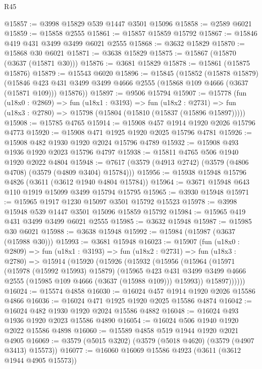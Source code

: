 \begin{lexlean}{R45}
\begin{coremodule}
@15857 := @3998 @15829 @539 @1447 @3501 @15096
@15858 := @2589 @6021
@15859 := @15858 @2555
@15861 := @15857 @15859 @15792
@15867 := @15846 @419 @431 @3499 @3499 @6021 @2555
@15868 := @3632 @15829
@15870 := @15868 @30 @6021
@15871 := @3638 @15829
@15875 := @15867 (@15870 (@3637 (@15871 @30)))
@15876 := @3681 @15829
@15878 := @15861 (@15875 @15876)
@15879 := @15543 @6020
@15896 := @15845
    (@15852
      (@15878 @15879)
      (@15846 @423 @431 @3499 @3499 @4666 @2555 (@15868 @109 @4666 (@3637 (@15871 @109))) @15876))
@15897 := @9506 @15794
@15907 := @15778
    (fun (u18x0 : @2869) =>
    fun (u18x1 : @3193) =>
    fun (u18x2 : @2731) => fun (u18x3 : @2780) => @15798 (@15804 (@15810 (@15837 (@15896 @15897)))))
@15908 := @15785 @4765
@15914 := @15908 @457 @1914 @1920 @2026 @15796 @4773
@15920 := @15908 @471 @1925 @1920 @2025 @15796 @4781
@15926 := @15908 @482 @1930 @1920 @2024 @15796 @4789
@15932 := @15908 @493 @1936 @1920 @2023 @15796 @4797
@15938 := @15811 @4765 @506 @1940 @1920 @2022 @4804
@15948 := @7617 (@3579 (@4913 @2742) (@3579 (@4806 @4708) (@3579 (@4809 @3404) @15784)))
@15956 := @15938 @15948 @15796 @4826 (@3611 (@3612 @1940 @4804 @15784))
@15964 := @3671 @15948 @643 @110 @1919 @15099 @3499 @15794 @15795
@15965 := @3930 @15948
@15971 := @15965 @1917 @1230 @15097 @3501 @15792 @15523
@15978 := @3998 @15948 @539 @1447 @3501 @15096 @15859 @15792
@15984 := @15965 @419 @431 @3499 @3499 @6021 @2555
@15985 := @3632 @15948
@15987 := @15985 @30 @6021
@15988 := @3638 @15948
@15992 := @15984 (@15987 (@3637 (@15988 @30)))
@15993 := @3681 @15948
@16023 := @15907
    (fun (u18x0 : @2809) =>
    fun (u18x1 : @3193) =>
    fun (u18x2 : @2731) =>
    fun (u18x3 : @2780) =>
    @15914
      (@15920
        (@15926
          (@15932
            (@15956
              (@15964
                (@15971
                  (@15978 (@15992 @15993) @15879)
                  (@15965
                    @423
                    @431
                    @3499
                    @3499
                    @4666
                    @2555
                    (@15985 @109 @4666 (@3637 (@15988 @109)))
                    @15993))
                @15897))))))
@16024 := @15574 @4858
@16030 := @16024 @457 @1914 @1920 @2026 @15586 @4866
@16036 := @16024 @471 @1925 @1920 @2025 @15586 @4874
@16042 := @16024 @482 @1930 @1920 @2024 @15586 @4882
@16048 := @16024 @493 @1936 @1920 @2023 @15586 @4890
@16054 := @16024 @506 @1940 @1920 @2022 @15586 @4898
@16060 := @15589 @4858 @519 @1944 @1920 @2021 @4905
@16069 := @3579 (@5015 @3202) (@3579 (@5018 @4620) (@3579 (@4907 @3413) @15573))
@16077 := @16060 @16069 @15586 @4923 (@3611 (@3612 @1944 @4905 @15573))

\end{coremodule}
\end{lexlean}
